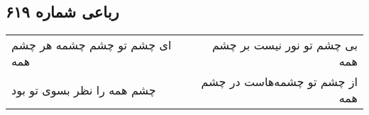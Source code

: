 \begin{center}
\section*{رباعی شماره ۶۱۹}
\label{sec:sh619}
\begin{longtable}{l p{0.5cm} r}
ای چشم تو چشم چشمه هر چشم همه
&&
بی چشم تو نور نیست بر چشم همه
\\
چشم همه را نظر بسوی تو بود
&&
از چشم تو چشمه‌هاست در چشم همه
\\
\end{longtable}
\end{center}
